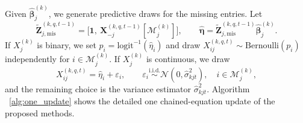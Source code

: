 \documentclass[12pt]{article}
\begin{document}
Given $\hat{\bm{\beta}}^{(k)}_j$, we generate predictive draws for the missing entries. Let
\[
\tilde{\bm{Z}}^{(k,q,t-1)}_{j,\mathrm{mis}}
=\big[\bm{1},\ \bm{X}^{(k,q,t-1)}_{-j}[\mathcal{M}^{(k)}_j]\big],
\qquad
\hat{\bm{\eta}}=\tilde{\bm{Z}}^{(k,q,t-1)}_{j,\mathrm{mis}}\hat{\bm{\beta}}^{(k)}_j.
\]
If $X^{(k)}_j$ is binary, we set $p_i=\mathrm{logit}^{-1}(\hat{\eta}_i)$ and draw $X^{(k,q,t)}_{ij}\sim\mathrm{Bernoulli}(p_i)$ independently for $i\in\mathcal{M}^{(k)}_j$. If $X^{(k)}_j$ is continuous, we draw
\[
X^{(k,q,t)}_{ij}=\hat{\eta}_i+\varepsilon_i,\qquad
\varepsilon_i\overset{\text{i.i.d.}}{\sim}\mathcal{N}(0,\hat{\sigma}^2_{kjt}),
\quad i\in\mathcal{M}^{(k)}_j,
\]
and the remaining choice is the variance estimator $\hat{\sigma}^2_{kjt}$. Algorithm ~\ref{alg:one_update} shows the detailed one chained-equation update of the proposed methods.
\end{document}
